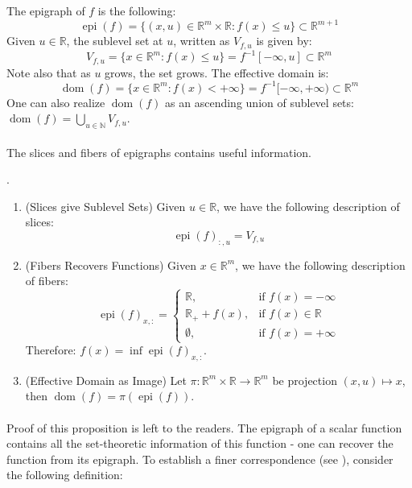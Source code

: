 \begin{defn}
	\label{defn:012-epi-dom-sublvl}
	The epigraph of $f$ is the following:
	\[
		\operatorname{epi}(f)=\{(x,u)\in \mathbb{R}^m\times \mathbb{R}:f(x)\leq u\}\subset \mathbb{R}^{m+1}
	\]
	Given $u\in \mathbb{R}$, the sublevel set at $u$, written as $V_{f,u}$ is given by:
	\[
		V_{f,u}=\{x\in \mathbb{R}^m :f(x)\leq u\}=f^{-1}[-\infty,u]\subset \mathbb{R}^m
	\]
	Note also that as $u$ grows, the set grows.	The effective domain is:
	\[
		\operatorname{dom}(f)=\{x\in \mathbb{R}^m:f(x)<+\infty\}=f^{-1}[-\infty,+\infty)\subset \mathbb{R}^m
	\]
	One can also realize $\operatorname{dom}(f)$ as an ascending union of sublevel sets: $\operatorname{dom}(f)=\bigcup_{u\in \mathbb{N}}V_{f,u}$.
\end{defn}

\paragraph{}The slices and fibers of epigraphs contains useful information.

\begin{prop}
	\label{prop:021-epi-slice-fibers}.
	\begin{enumerate}[label=(\alph*)]
		\item (Slices give Sublevel Sets) Given $u\in \mathbb{R}$, we have the following description of slices:
		      \[
			      \operatorname{epi}(f)_{:,u}=V_{f,u}
		      \]
		\item (Fibers Recovers Functions) Given $x\in \mathbb{R}^m$, we have the following description of fibers:
		      \[
			      \operatorname{epi}(f)_{x,:}=\begin{cases}
				      \mathbb{R},        & \text{if }f(x)=-\infty       \\
				      \mathbb{R}_++f(x), & \text{if }f(x)\in \mathbb{R} \\
				      \emptyset,         & \text{if }f(x)=+\infty
			      \end{cases}
		      \]
		      Therefore: $f(x)=\inf \operatorname{epi}(f)_{x,:}$.
		\item (Effective Domain as Image) Let $\pi:\mathbb{R}^{m}\times \mathbb{R}\to \mathbb{R}^m$ be projection $(x,u)\mapsto x$, then $\operatorname{dom}(f)=\pi(\operatorname{epi}(f))$.
	\end{enumerate}
\end{prop}

\paragraph{}Proof of this proposition is left to the readers. The epigraph of a scalar function contains all the set-theoretic information of this function - one can recover the function from its epigraph. To establish a finer correspondence (see ), consider the following definition:

